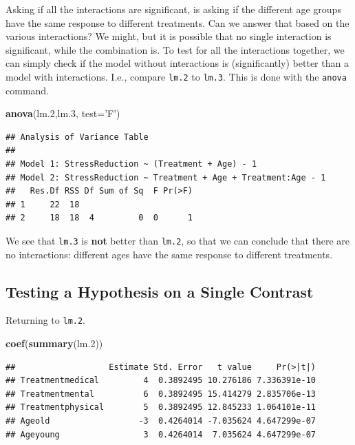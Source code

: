 \documentclass[]{book}
\newenvironment{Shaded}{\begin{snugshade}}{\end{snugshade}}
\newcommand{\KeywordTok}[1]{\textcolor[rgb]{0.13,0.29,0.53}{\textbf{{#1}}}}
\newcommand{\DataTypeTok}[1]{\textcolor[rgb]{0.13,0.29,0.53}{{#1}}}
\newcommand{\FloatTok}[1]{\textcolor[rgb]{0.00,0.00,0.81}{{#1}}}
\newcommand{\StringTok}[1]{\textcolor[rgb]{0.31,0.60,0.02}{{#1}}}
\newcommand{\NormalTok}[1]{{#1}}
\theoremstyle{definition}
\theoremstyle{definition}
\theoremstyle{remark}
\begin{document}
Asking if all the interactions are significant, is asking if the
different age groups have the same response to different treatments. Can
we answer that based on the various interactions? We might, but it is
possible that no single interaction is significant, while the
combination is. To test for all the interactions together, we can simply
check if the model without interactions is (significantly) better than a
model with interactions. I.e., compare \texttt{lm.2} to \texttt{lm.3}.
This is done with the \texttt{anova} command.

\begin{Shaded}
\begin{Highlighting}[]
\KeywordTok{anova}\NormalTok{(lm}\FloatTok{.2}\NormalTok{,lm}\FloatTok{.3}\NormalTok{, }\DataTypeTok{test=}\StringTok{'F'}\NormalTok{)}
\end{Highlighting}
\end{Shaded}

\begin{verbatim}
## Analysis of Variance Table
## 
## Model 1: StressReduction ~ (Treatment + Age) - 1
## Model 2: StressReduction ~ Treatment + Age + Treatment:Age - 1
##   Res.Df RSS Df Sum of Sq  F Pr(>F)
## 1     22  18                       
## 2     18  18  4         0  0      1
\end{verbatim}

We see that \texttt{lm.3} is \textbf{not} better than \texttt{lm.2}, so
that we can conclude that there are no interactions: different ages have
the same response to different treatments.

\subsection{Testing a Hypothesis on a Single
Contrast}\label{testing-a-hypothesis-on-a-single-contrast}

Returning to \texttt{lm.2}.

\begin{Shaded}
\begin{Highlighting}[]
\KeywordTok{coef}\NormalTok{(}\KeywordTok{summary}\NormalTok{(lm}\FloatTok{.2}\NormalTok{))}
\end{Highlighting}
\end{Shaded}

\begin{verbatim}
##                   Estimate Std. Error   t value     Pr(>|t|)
## Treatmentmedical         4  0.3892495 10.276186 7.336391e-10
## Treatmentmental          6  0.3892495 15.414279 2.835706e-13
## Treatmentphysical        5  0.3892495 12.845233 1.064101e-11
## Ageold                  -3  0.4264014 -7.035624 4.647299e-07
## Ageyoung                 3  0.4264014  7.035624 4.647299e-07
\end{verbatim}
\end{document}
